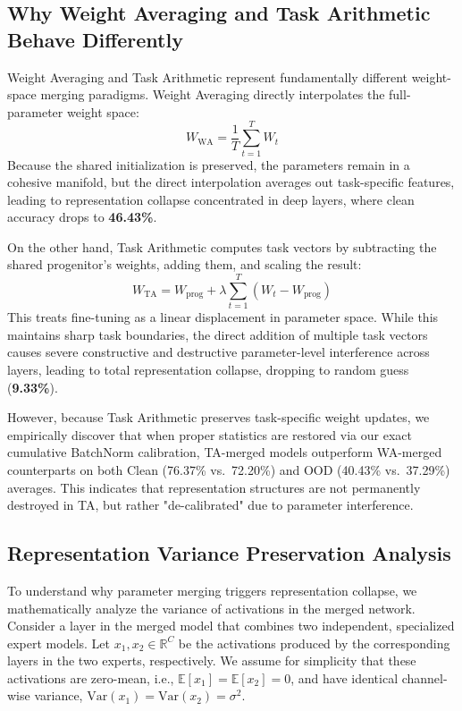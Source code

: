 \documentclass{article}
\theoremstyle{plain}
\theoremstyle{definition}
\theoremstyle{remark}
\begin{document}
\subsection{Why Weight Averaging and Task Arithmetic Behave Differently}
Weight Averaging and Task Arithmetic represent fundamentally different weight-space merging paradigms. Weight Averaging directly interpolates the full-parameter weight space:
\begin{equation}
    W_{\text{WA}} = \frac{1}{T} \sum_{t=1}^T W_t
\end{equation}
Because the shared initialization is preserved, the parameters remain in a cohesive manifold, but the direct interpolation averages out task-specific features, leading to representation collapse concentrated in deep layers, where clean accuracy drops to \textbf{46.43\%}.

On the other hand, Task Arithmetic computes task vectors by subtracting the shared progenitor's weights, adding them, and scaling the result:
\begin{equation}
    W_{\text{TA}} = W_{\text{prog}} + \lambda \sum_{t=1}^T (W_t - W_{\text{prog}})
\end{equation}
This treats fine-tuning as a linear displacement in parameter space. While this maintains sharp task boundaries, the direct addition of multiple task vectors causes severe constructive and destructive parameter-level interference across layers, leading to total representation collapse, dropping to random guess (\textbf{9.33\%}). 

However, because Task Arithmetic preserves task-specific weight updates, we empirically discover that when proper statistics are restored via our exact cumulative BatchNorm calibration, TA-merged models outperform WA-merged counterparts on both Clean (76.37\% vs.\ 72.20\%) and OOD (40.43\% vs.\ 37.29\%) averages. This indicates that representation structures are not permanently destroyed in TA, but rather "de-calibrated" due to parameter interference.

\subsection{Representation Variance Preservation Analysis}
To understand why parameter merging triggers representation collapse, we mathematically analyze the variance of activations in the merged network. Consider a layer in the merged model that combines two independent, specialized expert models. Let $x_1, x_2 \in \mathbb{R}^C$ be the activations produced by the corresponding layers in the two experts, respectively. We assume for simplicity that these activations are zero-mean, i.e., $\mathbb{E}[x_1] = \mathbb{E}[x_2] = 0$, and have identical channel-wise variance, $\text{Var}(x_1) = \text{Var}(x_2) = \sigma^2$.
\end{document}
